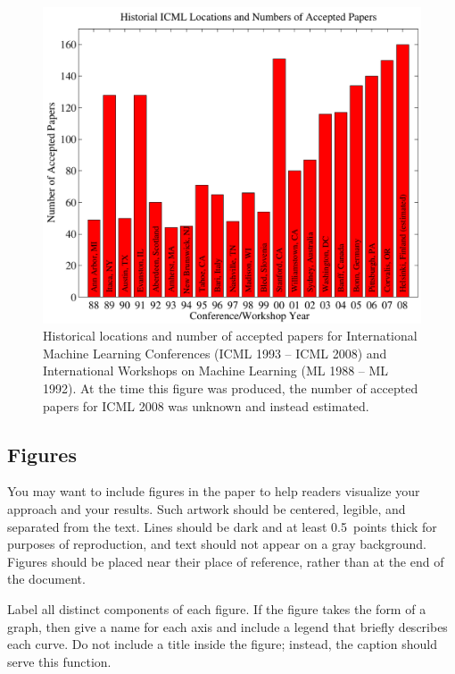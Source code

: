 \documentclass{article}
\begin{document}
\begin{figure}[ht]
\vskip 0.2in
\begin{center}
\centerline{\includegraphics[width=\columnwidth]{icml_numpapers}}
\caption{Historical locations and number of accepted papers for International
  Machine Learning Conferences (ICML 1993 -- ICML 2008) and
  International Workshops on Machine Learning (ML 1988 -- ML
  1992). At the time this figure was produced, the number of
  accepted papers for ICML 2008 was unknown and instead estimated.}
\label{icml-historical}
\end{center}
\vskip -0.2in
\end{figure}

\subsection{Figures}

You may want to include figures in the paper to help readers visualize
your approach and your results. Such artwork should be centered,
legible, and separated from the text. Lines should be dark and at
least 0.5~points thick for purposes of reproduction, and text should
not appear on a gray background. Figures should be placed
near their place of reference, rather than at the end of the document.

Label all distinct components of each figure. If the figure takes the
form of a graph, then give a name for each axis and include a legend
that briefly describes each curve. Do not include a title inside the
figure; instead, the caption should serve this function.
\end{document}
